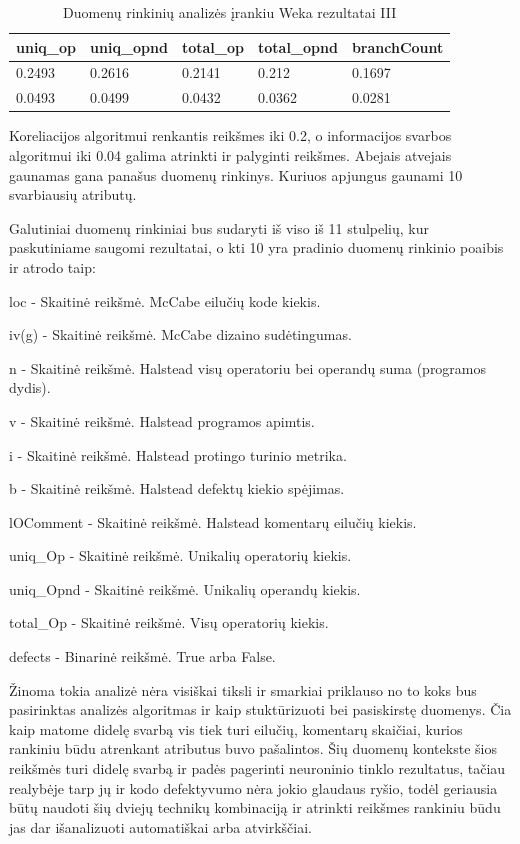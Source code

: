 \documentclass{VUMIFPSbakalaurinis}
\begin{document}
\begin{table}[H]
\centering
\caption{Duomenų rinkinių analizės įrankiu Weka rezultatai III}
\label{tab:weka_2}
\begin{tabular}{|lllll|}
\hline
uniq\_op & uniq\_opnd & total\_op & total\_opnd & branchCount \\ \hline
0.2493   & 0.2616     & 0.2141    & 0.212       & 0.1697      \\
0.0493   & 0.0499     & 0.0432    & 0.0362      & 0.0281      \\ \hline
\end{tabular}
\end{table}
Koreliacijos algoritmui renkantis reikšmes iki 0.2, o informacijos svarbos algoritmui iki 0.04 galima atrinkti ir palyginti reikšmes. Abejais atvejais gaunamas gana panašus duomenų rinkinys. Kuriuos apjungus gaunami 10 svarbiausių atributų.

Galutiniai duomenų rinkiniai bus sudaryti iš viso iš 11 stulpelių, kur paskutiniame saugomi rezultatai, o kti 10 yra pradinio duomenų rinkinio poaibis ir atrodo taip:
\begin{description} 
\item loc - Skaitinė reikšmė. McCabe eilučių kode kiekis.
\item iv(g) - Skaitinė reikšmė. McCabe dizaino sudėtingumas.
\item n - Skaitinė reikšmė. Halstead visų operatoriu bei operandų suma (programos dydis).
\item v - Skaitinė reikšmė. Halstead programos apimtis.
\item i - Skaitinė reikšmė. Halstead protingo turinio metrika.
\item b - Skaitinė reikšmė. Halstead defektų kiekio spėjimas.
\item lOComment - Skaitinė reikšmė. Halstead komentarų eilučių kiekis.
\item uniq\_Op - Skaitinė reikšmė. Unikalių operatorių kiekis.
\item uniq\_Opnd - Skaitinė reikšmė. Unikalių operandų kiekis.
\item total\_Op - Skaitinė reikšmė. Visų operatorių kiekis.
\item defects - Binarinė reikšmė. True arba False.
\end{description}

Žinoma tokia analizė nėra visiškai tiksli ir smarkiai priklauso no to koks bus pasirinktas analizės algoritmas ir kaip stuktūrizuoti bei pasiskirstę duomenys. Čia kaip matome didelę svarbą vis tiek turi eilučių, komentarų skaičiai, kurios rankiniu būdu atrenkant atributus buvo pašalintos. Šių duomenų kontekste šios reikšmės turi didelę svarbą ir padės pagerinti neuroninio tinklo rezultatus, tačiau realybėje tarp jų ir kodo defektyvumo nėra jokio glaudaus ryšio, todėl geriausia būtų naudoti šių dviejų technikų kombinaciją ir atrinkti reikšmes rankiniu būdu jas dar išanalizuoti automatiškai arba atvirkščiai.
\end{document}
